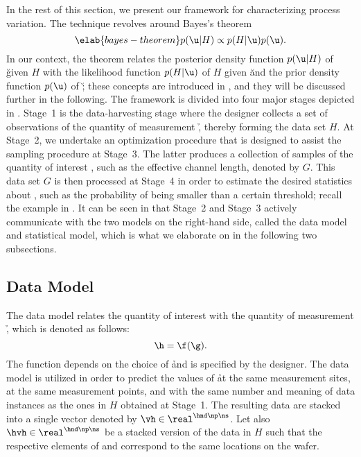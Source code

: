 In the rest of this section, we present our framework for characterizing process
variation. The technique revolves around Bayes's theorem \cite{gelman2013}
\begin{equation} \elab{bayes-theorem}
  p(\u | H) \propto p(H | \u) p(\u).
\end{equation}
In our context, the theorem relates the posterior density function $p(\u |H)$ of
\u given $H$ with the likelihood function $p(H | \u)$ of $H$ given \u and the
prior density function $p(\u)$ of \u; these concepts are introduced in
, and they will be discussed further in the following.
The framework is divided into four major stages depicted in
. Stage~1 is the data-harvesting stage where the designer
collects a set of observations of the quantity of measurement \h, thereby
forming the data set $H$. At Stage~2, we undertake an optimization procedure
that is designed to assist the sampling procedure at Stage~3. The latter
produces a collection of samples of the quantity of interest \g, such as the
effective channel length, denoted by $G$. This data set $G$ is then processed at
Stage~4 in order to estimate the desired statistics about \g, such as the
probability of \g being smaller than a certain threshold; recall the example in
. It can be seen in  that Stage~2
and Stage~3 actively communicate with the two models on the right-hand side,
called the data model and statistical model, which is what we elaborate on in
the following two subsections.

\subsection{Data Model}

The data model relates the quantity of interest \g with the quantity of
measurement \h, which is denoted as follows:
\[
  \h = \f(\g).
\]
The function \f depends on the choice of \h and is specified by the designer.
The data model is utilized in order to predict the values of \h at the same
measurement sites, at the same measurement points, and with the same number and
meaning of data instances as the ones in $H$ obtained at Stage~1. The resulting
data are stacked into a single vector denoted by $\vh \in \real^{\hnd \np \ns}$.
Let also $\hvh \in \real^{\hnd \np \ns}$ be a stacked version of the data in $H$
such that the respective elements of \vh and \hvh correspond to the same
locations on the wafer.

